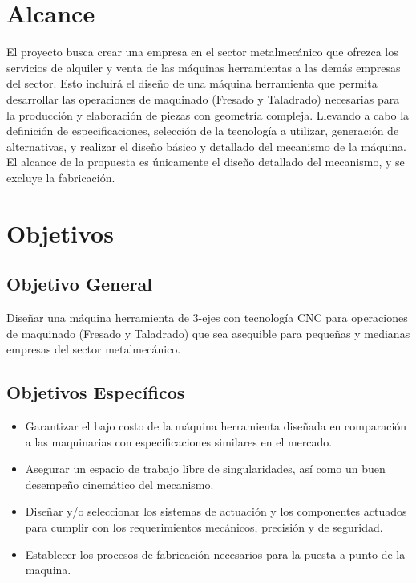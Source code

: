 \newpage


\newpage
\section{Alcance}
    El proyecto busca crear una empresa en el sector metalmecánico que ofrezca los servicios de alquiler y venta de las máquinas herramientas a las demás empresas del sector. Esto incluirá el diseño de una máquina herramienta que permita desarrollar las operaciones de maquinado (Fresado y Taladrado) necesarias para la producción y elaboración de piezas con geometría compleja. Llevando a cabo la definición de especificaciones, selección de la tecnología a utilizar, generación de alternativas, y realizar el diseño básico y detallado del mecanismo de la máquina. El alcance de la propuesta es únicamente el diseño detallado del mecanismo, y se excluye la fabricación.

\section{Objetivos}
\subsection{Objetivo General}
    Diseñar una máquina herramienta de 3-ejes con tecnología CNC para operaciones de maquinado (Fresado y Taladrado) que sea asequible para pequeñas y medianas empresas del sector metalmecánico.
    
    \subsection{Objetivos Específicos}
    \begin{itemize}
    \item Garantizar el bajo costo de la máquina herramienta diseñada en comparación a las maquinarias con especificaciones similares en el mercado.
    \item Asegurar un espacio de trabajo libre de singularidades, así como un buen desempeño cinemático del mecanismo.
    \item Diseñar y/o seleccionar los sistemas de actuación y los componentes actuados para cumplir con los requerimientos mecánicos, precisión y de seguridad.
    \item Establecer los procesos de fabricación necesarios para la puesta a punto de la maquina.
    \end{itemize}
\newpage

